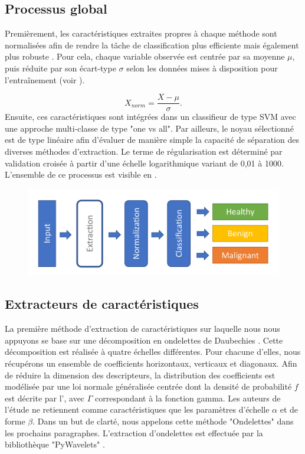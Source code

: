\documentclass{gretsi}
\begin{document}
\begin{sloppypar}
\subsection{Processus global}
Premièrement, les caractéristiques extraites propres à chaque méthode sont normalisées afin de rendre la tâche de classification plus efficiente mais également plus robuste \cite{graf2001}. Pour cela, chaque variable observée est centrée par sa moyenne $\mu$, puis réduite par son écart-type $\sigma$ selon les données mises à disposition pour l'entraînement (voir ).\par
\begin{equation}
    X_{norm} = \frac{X-\mu}{\sigma}.
    \label{standard_score}
\end{equation}
Ensuite, ces caractéristiques sont intégrées dans un classifieur de type SVM avec une approche multi-classe de type "one vs all". Par ailleurs, le noyau sélectionné est de type linéaire afin d'évaluer de manière simple la capacité de séparation des diverses méthodes d'extraction. Le terme de régularisation est déterminé par validation croisée à partir d'une échelle logarithmique variant de 0,01 à 1000. L'ensemble de ce processus est visible en .\par
\par
\begin{figure}[h]
    \begin{center} 
        \includegraphics[width=0.8\linewidth]{content/figures/Simple.pdf}
        \label{pipeline}
    \end{center} 
\end{figure}

\subsection{Extracteurs de caractéristiques}
La première méthode d'extraction de caractéristiques sur laquelle nous nous appuyons se base sur une décomposition en ondelettes de Daubechies \cite{Halimi2017a}. Cette décomposition est réalisée à quatre échelles différentes. Pour chacune d'elles, nous récupérons un ensemble de coefficients horizontaux, verticaux et diagonaux. Afin de réduire la dimension des descripteurs, la distribution des coefficients est modélisée par une loi normale généralisée centrée dont la densité de probabilité $f$ est décrite par l', avec $\Gamma$ correspondant à la fonction gamma. Les auteurs de l'étude ne retiennent comme caractéristiques que les paramètres d'échelle $\alpha$ et de forme $\beta$. Dans un but de clarté, nous appelons cette méthode "Ondelettes" dans les prochains paragraphes. L'extraction d'ondelettes est effectuée par la bibliothèque "PyWavelets" \cite{lee2006pywavelets}.\par


\end{sloppypar}
\end{document}
